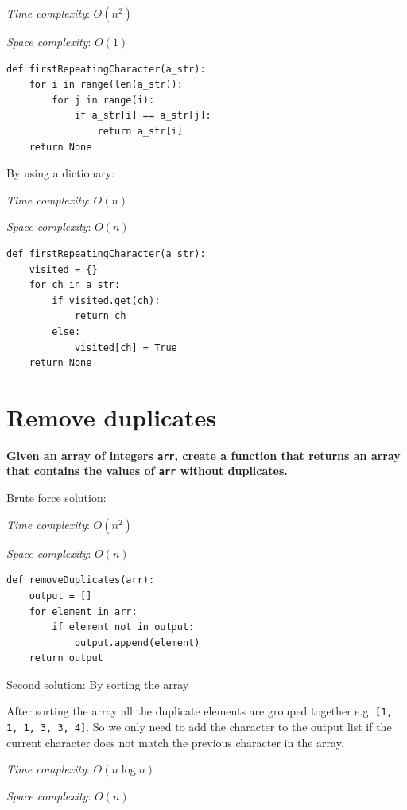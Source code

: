 \documentclass[a4paper,11pt]{book}
\begin{document}
\noindent \textit{Time complexity}: $O(n^2)$

\noindent \textit{Space complexity}: $O(1)$

\begin{lstlisting}
def firstRepeatingCharacter(a_str):
    for i in range(len(a_str)):
        for j in range(i):
            if a_str[i] == a_str[j]:
                return a_str[i]
    return None
\end{lstlisting}

\noindent By using a dictionary:

\noindent \textit{Time complexity}: $O(n)$

\noindent \textit{Space complexity}: $O(n)$

\begin{lstlisting}
def firstRepeatingCharacter(a_str):
    visited = {}
    for ch in a_str:
        if visited.get(ch):
            return ch
        else:
            visited[ch] = True
    return None
\end{lstlisting}

\newpage
\section{Remove duplicates}

\textbf{Given an array of integers \lstinline{arr}, create a function that returns an array that contains the values of \lstinline{arr} without duplicates.}
\vspace{5mm}

\noindent Brute force solution:

\noindent \textit{Time complexity}: $O(n^2)$

\noindent \textit{Space complexity}: $O(n)$

\begin{lstlisting}
def removeDuplicates(arr):
    output = []
    for element in arr:
        if element not in output:
            output.append(element)
    return output
\end{lstlisting}

\noindent Second solution: By sorting the array

After sorting the array all the duplicate elements are grouped together e.g. \lstinline{[1, 1, 1, 3, 3, 4]}. So we only need to add the character to the output list if the current character does not match the previous character in the array.

\noindent \textit{Time complexity}: $O(n\log n)$

\noindent \textit{Space complexity}: $O(n)$
\end{document}
